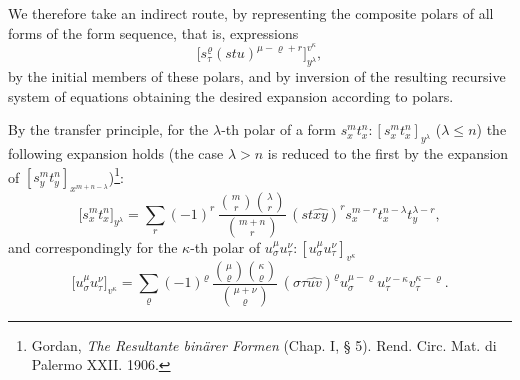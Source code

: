 \documentclass[11pt]{article}
\begin{document}
We therefore take an indirect route, by representing the composite polars of all forms of the form sequence, that is, expressions
\[
\bigl[s_\tau^\varrho(stu)^{\mu-\varrho+r}\bigr]_{y^\lambda}^{v^\kappa},
\]
by the initial members of these polars, and by inversion of the resulting recursive system of equations obtaining the desired expansion according to polars.

By the transfer principle, for the $\lambda$-th polar of a form $s_x^m t_x^n:[s_x^m t_x^n]_{y^\lambda}$ ($\lambda\le n$) the following expansion holds (the case $\lambda>n$ is reduced to the first by the expansion of $[s_y^m t_y^n]_{x^{m+n-\lambda}}$)\footnote{Gordan, \emph{The Resultante binärer Formen} (Chap. I, § 5). Rend. Circ. Mat. di Palermo XXII. 1906.}:
\[
\bigl[s_x^m t_x^n\bigr]_{y^\lambda}
=\sum_r (-1)^r\,
\frac{\binom{m}{r}\binom{\lambda}{r}}{\binom{m+n}{r}}\,
(st\widehat{xy})^r s_x^{m-r}t_x^{n-\lambda}t_y^{\lambda-r},
\]
and correspondingly for the $\kappa$-th polar of $u_\sigma^\mu u_\tau^\nu:[u_\sigma^\mu u_\tau^\nu]_{v^\kappa}$
\[
\bigl[u_\sigma^\mu u_\tau^\nu\bigr]_{v^\kappa}
=\sum_\varrho (-1)^\varrho\,
\frac{\binom{\mu}{\varrho}\binom{\kappa}{\varrho}}{\binom{\mu+\nu}{\varrho}}\,
(\sigma\tau\widehat{uv})^\varrho u_\sigma^{\mu-\varrho}u_\tau^{\nu-\kappa}v_\tau^{\kappa-\varrho}.
\]
\end{document}
